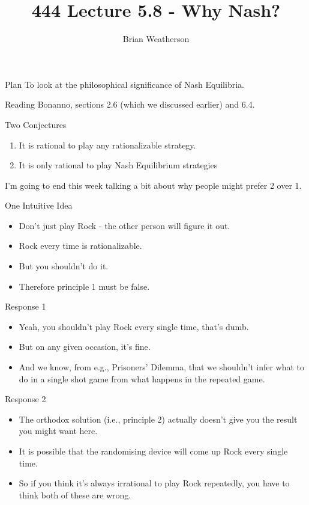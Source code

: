 \documentclass[
  ignorenonframetext,
]{beamer}
\title{444 Lecture 5.8 - Why Nash?}
\author{Brian Weatherson}
\date{}
\providecommand{\tightlist}{%
  \setlength{\itemsep}{0pt}\setlength{\parskip}{0pt}}
\begin{document}
\frame{\titlepage}

\begin{frame}{Plan}
\protect\hypertarget{plan}{}
To look at the philosophical significance of Nash Equilibria.
\end{frame}

\begin{frame}{Reading}
\protect\hypertarget{reading}{}
Bonanno, sections 2.6 (which we discussed earlier) and 6.4.
\end{frame}

\begin{frame}{Two Conjectures}
\protect\hypertarget{two-conjectures}{}
\begin{enumerate}
\tightlist
\item
  It is rational to play any rationalizable strategy.
\item
  It is only rational to play Nash Equilibrium strategies
\end{enumerate}

I'm going to end this week talking a bit about why people might prefer 2
over 1.
\end{frame}

\begin{frame}{One Intuitive Idea}
\protect\hypertarget{one-intuitive-idea}{}
\begin{itemize}
\tightlist
\item
  Don't just play Rock - the other person will figure it out.
\item
  Rock every time is rationalizable.
\item
  But you shouldn't do it.
\item
  Therefore principle 1 must be false.
\end{itemize}
\end{frame}

\begin{frame}{Response 1}
\protect\hypertarget{response-1}{}
\begin{itemize}
\tightlist
\item
  Yeah, you shouldn't play Rock every single time, that's dumb.
\item
  But on any given occasion, it's fine.
\item
  And we know, from e.g., Prisoners' Dilemma, that we shouldn't infer
  what to do in a single shot game from what happens in the repeated
  game.
\end{itemize}
\end{frame}

\begin{frame}{Response 2}
\protect\hypertarget{response-2}{}
\begin{itemize}
\tightlist
\item
  The orthodox solution (i.e., principle 2) actually doesn't give you
  the result you might want here.
\item
  It is possible that the randomising device will come up Rock every
  single time.
\item
  So if you think it's always irrational to play Rock repeatedly, you
  have to think both of these are wrong.
\end{itemize}
\end{frame}
\end{document}
